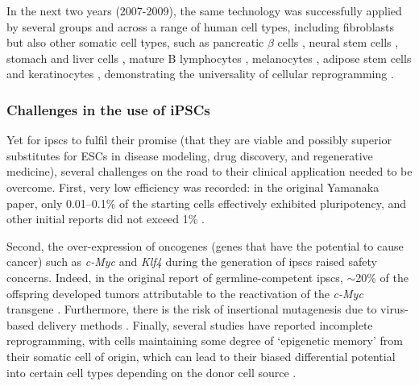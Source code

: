 In the next two years (2007-2009), the same technology was successfully applied by several groups and across a range of human cell types, including fibroblasts \cite{park2008reprogramming} but also other somatic cell types, such as pancreatic $\beta$ cells \cite{stadtfeld2008reprogramming}, neural stem cells \cite{eminli2008reprogramming, kim2008pluripotent}, stomach and liver cells \cite{aoi2008generation}, mature B lymphocytes \cite{hanna2008direct}, melanocytes \cite{utikal2009sox2}, adipose stem cells \cite{sun2009feeder} and keratinocytes \cite{maherali2008high}, demonstrating the universality of cellular reprogramming \cite{omole2018ten}.


\subsubsection{Challenges in the use of iPSCs}
Yet for \glspl{ipsc} to fulfil their promise (that they are viable and possibly superior substitutes for ESCs in disease modeling, drug discovery, and regenerative medicine), several challenges on the road to their clinical application needed to be overcome.
First, very low efficiency was recorded: in the original Yamanaka paper, only 0.01–0.1\% \cite{takahashi2006induction} of the starting cells effectively exhibited pluripotency, and other initial reports did not exceed 1\% \cite{takahashi2007induction, okita2007generation, lowry2008generation}.

Second, the over-expression of oncogenes (genes that have the potential to cause cancer) such as \textit{c-Myc} and \textit{Klf4} during the generation of \glspl{ipsc} raised safety concerns.
Indeed, in the original report of germline-competent \glspl{ipsc}, $\sim$20\% of the offspring developed tumors attributable to the reactivation of the \textit{c-Myc} transgene \cite{okita2007generation}. 
Furthermore, there is the risk of insertional mutagenesis due to virus-based delivery methods \cite{takahashi2006induction, takahashi2007induction, yu2007induced}. 
Finally, several studies have reported incomplete reprogramming, with cells maintaining some degree of `epigenetic memory' from their somatic cell of origin, which can lead to their biased differential potential into certain cell types depending on the donor cell source \cite{kim2010epigenetic, polo2010cell}.\\

